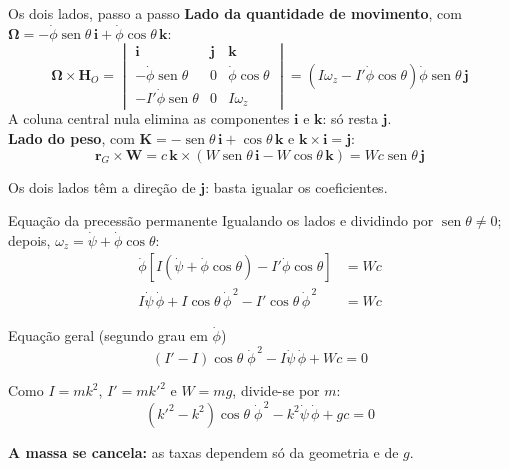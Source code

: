 \documentclass[11pt,aspectratio=169]{beamer}
\newcommand{\vet}[1]{\mathbf{#1}}
\newcommand{\vOmega}{\boldsymbol{\Omega}}
\newcommand{\seno}{\operatorname{sen}}
\newcommand{\phid}{\dot{\phi}}
\newcommand{\psid}{\dot{\psi}}
\begin{document}
\begin{frame}{Os dois lados, passo a passo}
  \small
  \textbf{Lado da quantidade de movimento}, com $\vOmega=-\phid\seno\theta\,\vet{i}+\phid\cos\theta\,\vet{k}$:
  \[
    \vOmega\times\vet{H}_O=
    \begin{vmatrix}
      \vet{i}&\vet{j}&\vet{k}\\
      -\phid\seno\theta&0&\phid\cos\theta\\
      -I'\phid\seno\theta&0&I\omega_z
    \end{vmatrix}
    =\left(I\omega_z-I'\phid\cos\theta\right)\phid\seno\theta\,\vet{j}
  \]
  A coluna central nula elimina as componentes $\vet{i}$ e $\vet{k}$: só resta $\vet{j}$.\\[0.25cm]
  \textbf{Lado do peso}, com $\vet{K}=-\seno\theta\,\vet{i}+\cos\theta\,\vet{k}$ e $\vet{k}\times\vet{i}=\vet{j}$:
  \[
    \vet{r}_G\times\vet{W}
    =c\,\vet{k}\times\left(W\seno\theta\,\vet{i}-W\cos\theta\,\vet{k}\right)
    =Wc\seno\theta\,\vet{j}
  \]
  \begin{center}
    Os dois lados têm a direção de $\vet{j}$: basta igualar os coeficientes.
  \end{center}
\end{frame}

\begin{frame}{Equação da precessão permanente}
  Igualando os lados e dividindo por $\seno\theta\neq0$; depois, $\omega_z=\psid+\phid\cos\theta$:
  \begin{align*}
    \phid\left[I\left(\psid+\phid\cos\theta\right)-I'\phid\cos\theta\right]&=Wc\\
    I\psid\,\phid+I\cos\theta\,\phid^{\,2}-I'\cos\theta\,\phid^{\,2}&=Wc
  \end{align*}
  \begin{block}{Equação geral (segundo grau em $\phid$)}
    \[
      (I'-I)\cos\theta\;\phid^{\,2}-I\psid\,\phid+Wc=0
    \]
  \end{block}
  \vspace{0.15cm}
  Como $I=mk^2$, $I'=mk'^2$ e $W=mg$, divide-se por $m$:
  \[
    (k'^2-k^2)\cos\theta\;\phid^{\,2}-k^2\psid\,\phid+gc=0
  \]
  \begin{center}
    \textbf{A massa se cancela:} as taxas dependem só da geometria e de $g$.
  \end{center}
\end{frame}
\end{document}
